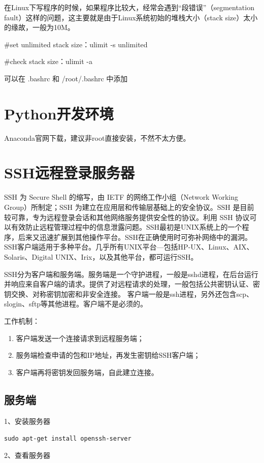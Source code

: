 在Linux下写程序的时候，如果程序比较大，经常会遇到“段错误”（segmentation fault）这样的问题，这主要就是由于Linux系统初始的堆栈大小（stack size）太小的缘故，一般为10M。

\#set unlimited stack size：ulimit -s unlimited

\#check stack size：ulimit -a

可以在 .bashrc 和 /root/.bashrc 中添加



\section{Python开发环境}
Anaconda官网下载，建议非root直接安装，不然不太方便。


\section{SSH远程登录服务器}
SSH 为 Secure Shell 的缩写，由 IETF 的网络工作小组（Network Working Group）所制定；SSH 为建立在应用层和传输层基础上的安全协议。SSH 是目前较可靠，专为远程登录会话和其他网络服务提供安全性的协议。利用 SSH 协议可以有效防止远程管理过程中的信息泄露问题。SSH最初是UNIX系统上的一个程序，后来又迅速扩展到其他操作平台。SSH在正确使用时可弥补网络中的漏洞。SSH客户端适用于多种平台。几乎所有UNIX平台—包括HP-UX、Linux、AIX、Solaris、Digital UNIX、Irix，以及其他平台，都可运行SSH。

SSH分为客户端和服务端。服务端是一个守护进程，一般是sshd进程，在后台运行并响应来自客户端的请求。提供了对远程请求的处理，一般包括公共密钥认证、密钥交换、对称密钥加密和非安全连接。
客户端一般是ssh进程，另外还包含scp、slogin、sftp等其他进程。客户端不是必须的。

工作机制：
\begin{enumerate}
\item 客户端发送一个连接请求到远程服务端；
\item 服务端检查申请的包和IP地址，再发生密钥给SSH客户端；
\item 客户端再将密钥发回服务端，自此建立连接。
\end{enumerate}


\subsection{服务端}
1、安装服务器

\verb|sudo apt-get install openssh-server|

2、查看服务器

